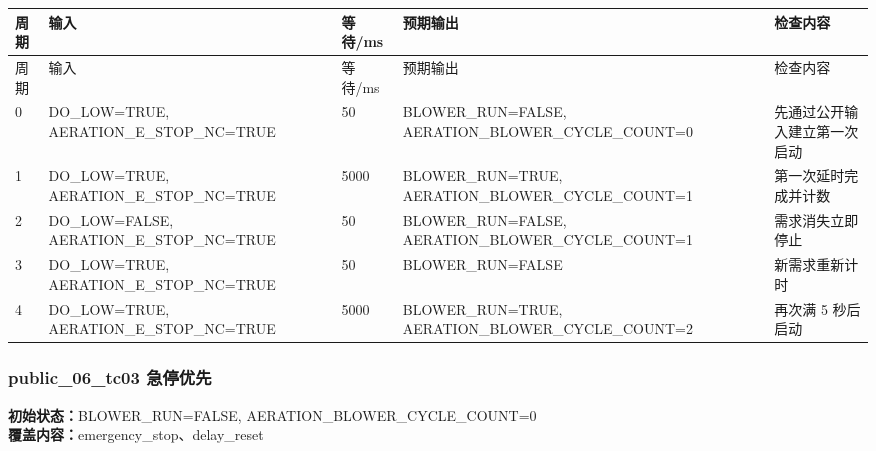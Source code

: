 \begin{longtable}{L{1.0cm}L{4.7cm}L{1.4cm}L{4.0cm}L{2.1cm}}

\toprule

周期 & 输入 & 等待/ms & 预期输出 & 检查内容\\

\midrule

\endfirsthead

\toprule

周期 & 输入 & 等待/ms & 预期输出 & 检查内容\\

\midrule

\endhead

0 & DO\_LOW=TRUE, AERATION\_E\_STOP\_NC=TRUE & 50 & BLOWER\_RUN=FALSE, AERATION\_BLOWER\_CYCLE\_COUNT=0 & 先通过公开输入建立第一次启动\\

1 & DO\_LOW=TRUE, AERATION\_E\_STOP\_NC=TRUE & 5000 & BLOWER\_RUN=TRUE, AERATION\_BLOWER\_CYCLE\_COUNT=1 & 第一次延时完成并计数\\

2 & DO\_LOW=FALSE, AERATION\_E\_STOP\_NC=TRUE & 50 & BLOWER\_RUN=FALSE, AERATION\_BLOWER\_CYCLE\_COUNT=1 & 需求消失立即停止\\

3 & DO\_LOW=TRUE, AERATION\_E\_STOP\_NC=TRUE & 50 & BLOWER\_RUN=FALSE & 新需求重新计时\\

4 & DO\_LOW=TRUE, AERATION\_E\_STOP\_NC=TRUE & 5000 & BLOWER\_RUN=TRUE, AERATION\_BLOWER\_CYCLE\_COUNT=2 & 再次满 5 秒后启动\\

\bottomrule

\end{longtable}

\subsubsection{{\ttfamily public\_06\_tc03} 急停优先}

\noindent\textbf{初始状态：}BLOWER\_RUN=FALSE, AERATION\_BLOWER\_CYCLE\_COUNT=0\\

\textbf{覆盖内容：}emergency\_stop、delay\_reset

